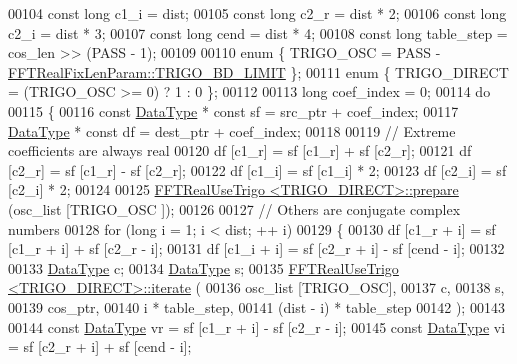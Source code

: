 \begin{DoxyCode}
00104     \textcolor{keyword}{const} \textcolor{keywordtype}{long}      c1\_i = dist;
00105     \textcolor{keyword}{const} \textcolor{keywordtype}{long}      c2\_r = dist * 2;
00106     \textcolor{keyword}{const} \textcolor{keywordtype}{long}      c2\_i = dist * 3;
00107     \textcolor{keyword}{const} \textcolor{keywordtype}{long}      cend = dist * 4;
00108     \textcolor{keyword}{const} \textcolor{keywordtype}{long}      table\_step = cos\_len >> (PASS - 1);
00109 
00110    \textcolor{keyword}{enum} \{   TRIGO\_OSC       = PASS - \hyperlink{a00012_a7a7b234f07dec3342f211f70fc354249acc7080c97a1906e1284b5c5b467bf068}{FFTRealFixLenParam::TRIGO\_BD\_LIMIT}   
      \};
00111     \textcolor{keyword}{enum} \{  TRIGO\_DIRECT    = (TRIGO\_OSC >= 0) ? 1 : 0  \};
00112 
00113     \textcolor{keywordtype}{long}                coef\_index = 0;
00114     \textcolor{keywordflow}{do}
00115     \{
00116         \textcolor{keyword}{const} \hyperlink{a00014_adecc3668f71245ef20a93546a55b3190}{DataType}  * \textcolor{keyword}{const} sf = src\_ptr + coef\_index;
00117         \hyperlink{a00014_adecc3668f71245ef20a93546a55b3190}{DataType}            * \textcolor{keyword}{const} df = dest\_ptr + coef\_index;
00118 
00119         \textcolor{comment}{// Extreme coefficients are always real}
00120         df [c1\_r] = sf [c1\_r] + sf [c2\_r];
00121         df [c2\_r] = sf [c1\_r] - sf [c2\_r];
00122         df [c1\_i] = sf [c1\_i] * 2;
00123         df [c2\_i] = sf [c2\_i] * 2;
00124 
00125         \hyperlink{a00016}{FFTRealUseTrigo <TRIGO\_DIRECT>::prepare} (osc\_list [TRIGO\_OSC
      ]);
00126 
00127         \textcolor{comment}{// Others are conjugate complex numbers}
00128         \textcolor{keywordflow}{for} (\textcolor{keywordtype}{long} i = 1; i < dist; ++ i)
00129         \{
00130             df [c1\_r + i] = sf [c1\_r + i] + sf [c2\_r - i];
00131             df [c1\_i + i] = sf [c2\_r + i] - sf [cend - i];
00132 
00133             \hyperlink{a00014_adecc3668f71245ef20a93546a55b3190}{DataType}            c;
00134             \hyperlink{a00014_adecc3668f71245ef20a93546a55b3190}{DataType}            s;
00135             \hyperlink{a00016}{FFTRealUseTrigo <TRIGO\_DIRECT>::iterate} (
00136                 osc\_list [TRIGO\_OSC],
00137                 c,
00138                 s,
00139                 cos\_ptr,
00140                 i * table\_step,
00141                 (dist - i) * table\_step
00142             );
00143 
00144             \textcolor{keyword}{const} \hyperlink{a00014_adecc3668f71245ef20a93546a55b3190}{DataType}  vr = sf [c1\_r + i] - sf [c2\_r - i];
00145             \textcolor{keyword}{const} \hyperlink{a00014_adecc3668f71245ef20a93546a55b3190}{DataType}  vi = sf [c2\_r + i] + sf [cend - i];

\end{DoxyCode}
